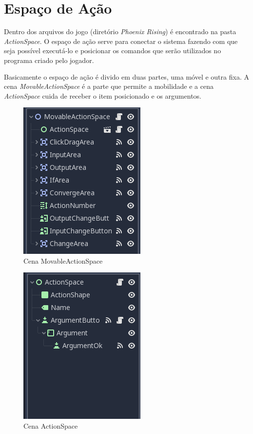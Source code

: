 \section{Espaço de Ação}

Dentro dos arquivos do jogo (diretório \textit{Phoenix Rising}) é encontrado na 
pasta \textit{ActionSpace}. O espaço de ação serve para conectar o sistema
fazendo com que seja possível executá-lo e posicionar os comandos que serão
utilizados no programa criado pelo jogador.

Basicamente o espaço de ação é divido em duas partes, uma móvel e outra fixa.
A cena \textit{MovableActionSpace} é a parte que permite a mobilidade e a cena
\textit{ActionSpace} cuida de receber o item posicionado e os argumentos.

\begin{minipage}[c]{0.5\textwidth}
    \begin{figure}[H]
        \includegraphics[scale=0.8]{../figuras/cena_movable_action_space.png}
        \caption{Cena MovableActionSpace}
    \end{figure}
\end{minipage}%
\begin{minipage}[c]{0.6\textwidth}
    \begin{figure}[H]
        \includegraphics[scale=0.8]{../figuras/cena_action_space.png}
        \caption{Cena ActionSpace}
    \end{figure}
\end{minipage}

